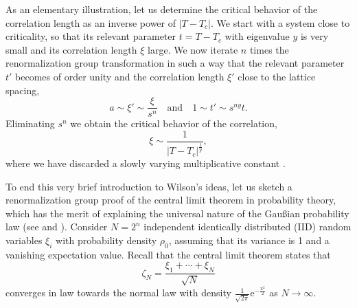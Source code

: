 \documentclass[10pt,here,feynmf]{article}
\begin{document}
As an elementary illustration, let us determine the critical behavior of the correlation length as an inverse power of $|T-T_{c}|$. We start with a system close to criticality, so that its relevant parameter $t=T-T_{c}$ with eigenvalue $y$ is very small and its correlation length $\xi$ large. We now iterate $n$ times the renormalization group transformation in such a way that the relevant parameter $t'$ becomes of order unity and the correlation length $\xi'$ close to the lattice spacing,
\begin{equation}
a\sim\xi'\sim\frac{\xi}{s^{n}}\quad\mathrm{and}\quad1\sim t'\sim s^{ny}t.
\end{equation}
Eliminating $s^{n}$ we obtain the critical behavior of the correlation, 
\begin{equation}
\xi\sim\frac{1}{|T-T_{c}|^{\frac{1}{y}}},
\end{equation}
where we have discarded a slowly varying  multiplicative constant . 


To end this very brief introduction to Wilson's ideas, let us sketch a renormalization group proof of the central limit theorem in probability theory, which has the merit of explaining the universal nature of the Gau\ss ian probability law (see \cite{sinai} and \cite{jona}). Consider $N=2^{n}$ independent identically distributed (IID) random variables $\xi_{i}$ with probability density $\rho_{0}$, assuming that its variance is 1 and a vanishing expectation value. Recall that the central limit theorem states that  
\begin{equation}
\zeta_{N}=\frac{\xi_{1}+\cdots+\xi_{N}}{\sqrt{N}}
\end{equation}
converges in law towards the normal law with density $\frac{1}{\sqrt{2\pi}}\mathrm{e^{-\frac{x^{2}}{2}}}$ as $N\rightarrow\infty$.
 
\end{document}
